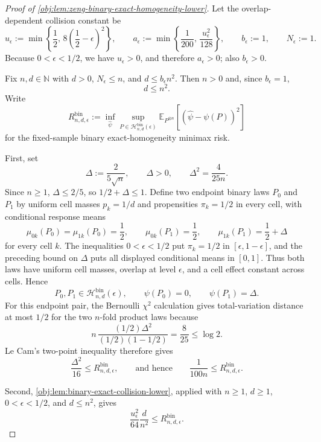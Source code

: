 \begin{proof}[Proof of \cref{obj:lem:zeng-binary-exact-homogeneity-lower}]
Let the overlap-dependent collision constant be
\[
u_\epsilon:=\min\left\{\frac12,\,8\left(\frac12-\epsilon\right)^2\right\},
\qquad
a_\epsilon:=\min\left\{\frac1{200},\,\frac{u_\epsilon^2}{128}\right\},
\qquad
b_\epsilon:=1,
\qquad
N_\epsilon:=1 .
\]
Because \(0<\epsilon<1/2\), we have \(u_\epsilon>0\), and therefore \(a_\epsilon>0\); also \(b_\epsilon>0\).

Fix \(n,d\in\mathbb N\) with \(d>0\), \(N_\epsilon\le n\), and \(d\le b_\epsilon n^2\).  Then \(n>0\) and, since \(b_\epsilon=1\),
\[
d\le n^2 .
\]
Write
\[
R_{n,d,\epsilon}^{\mathrm{bin}}
:=
\inf_{\widehat\psi}
\sup_{P\in\mathcal H_{n,d}^{\mathrm{bin}}(\epsilon)}
\mathbb E_{P^{\otimes n}}\!\left[(\widehat\psi-\psi(P))^2\right]
\]
for the fixed-sample binary exact-homogeneity minimax risk.

First, set
\[
\Delta:=\frac{2}{5\sqrt n},
\qquad
\Delta>0,
\qquad
\Delta^2=\frac{4}{25n}.
\]
Since \(n\ge1\), \(\Delta\le2/5\), so \(1/2+\Delta\le1\).  Define two endpoint binary laws \(P_0\) and \(P_1\) by uniform cell masses \(p_k=1/d\) and propensities \(\pi_k=1/2\) in every cell, with conditional response means
\[
\mu_{0k}(P_0)=\mu_{1k}(P_0)=\frac12,
\qquad
\mu_{0k}(P_1)=\frac12,
\qquad
\mu_{1k}(P_1)=\frac12+\Delta
\]
for every cell \(k\).  The inequalities \(0<\epsilon<1/2\) put \(\pi_k=1/2\) in \([\epsilon,1-\epsilon]\), and the preceding bound on \(\Delta\) puts all displayed conditional means in \([0,1]\).  Thus both laws have uniform cell masses, overlap at level \(\epsilon\), and a cell effect constant across cells.  Hence
\[
P_0,P_1\in\mathcal H_{n,d}^{\mathrm{bin}}(\epsilon),
\qquad
\psi(P_0)=0,
\qquad
\psi(P_1)=\Delta .
\]
For this endpoint pair, the Bernoulli \(\chi^2\) calculation gives total-variation distance at most \(1/2\) for the two \(n\)-fold product laws because
\[
n\,
\frac{(1/2)\Delta^2}{(1/2)(1-1/2)}
=
\frac{8}{25}
\le \log 2 .
\]
Le Cam's two-point inequality therefore gives
\[
\frac{\Delta^2}{16}
\le
R_{n,d,\epsilon}^{\mathrm{bin}},
\qquad\text{and hence}\qquad
\frac{1}{100n}
\le
R_{n,d,\epsilon}^{\mathrm{bin}} .
\]

Second, \cref{obj:lem:binary-exact-collision-lower}, applied with \(n\ge1\), \(d\ge1\), \(0<\epsilon<1/2\), and \(d\le n^2\), gives
\[
\frac{u_\epsilon^2}{64}\frac{d}{n^2}
\le
R_{n,d,\epsilon}^{\mathrm{bin}} .
\]


\end{proof}
